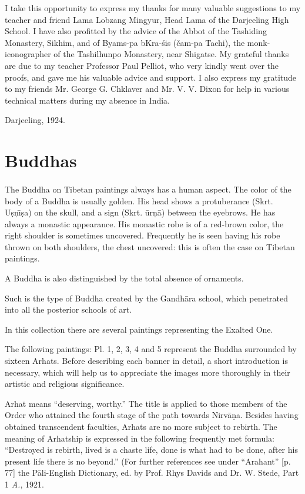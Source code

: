 \documentclass[a4paper, 12pt, oneside]{article}
\begin{document}
I take this opportunity to express my thanks for many valuable suggestions to my teacher and friend Lama Lobzang Mingyur, Head Lama of the Darjeeling High School. I have also profitted by the advice of the Abbot of the Tashiding Monastery, Sikhim, and of Byams-pa bKra-\'{s}is (čam-pa Tachi), the monk-iconographer of the Tashilhunpo Monastery, near Shigatse. My grateful thanks are due to my teacher Professor Paul Pelliot, who very kindly went over the proofs, and gave me his valuable advice and support. I also express my gratitude to my friends Mr. George G. Chklaver and Mr. V. V. Dixon for help in various technical matters during my absence in India.

Darjeeling, 1924.

\clearpage
\section{Buddhas}
\paragraph{}
The Buddha on Tibetan paintings always has a human aspect. The color of the body of a Buddha is usually golden. His head shows a protuberance (Skrt. U\d{s}\d{n}\={\i}\d{s}a) on the skull, and a sign (Skrt. \={u}r\d{n}\={a}) between the eyebrows. He has always a monastic appearance. His monastic robe is of a red-brown color, the right shoulder is sometimes uncovered. Frequently he is seen having his robe thrown on both shoulders, the chest uncovered: this is often the case on Tibetan paintings.

A Buddha is also distinguished by the total absence of ornaments.

Such is the type of Buddha created by the Gandh\={a}ra school, which penetrated into all the posterior schools of art.

In this collection there are several paintings representing the Exalted One.

The following paintings: Pl. 1, 2, 3, 4 and 5 represent the Buddha surrounded by sixteen Arhats. Before describing each banner in detail, a short introduction is necessary, which will help us to appreciate the images more thoroughly in their artistic and religious significance.

Arhat means ``deserving, worthy.'' The title is applied to those members of the Order who attained the fourth stage of the path towards Nirv\={a}\d{n}a. Besides having obtained transcendent faculties, Arhats are no more subject to rebirth. The meaning of Arhatship is expressed in the following frequently met formula: ``Destroyed is rebirth, lived is a chaste life, done is what had to be done, after his present life there is no beyond.'' (For further references see under ``Arahant'' [p. 77] the P\={a}li-English Dictionary, ed. by Prof. Rhys Davids and Dr. W. Stede, Part 1 \emph{A.}, 1921.
\end{document}
